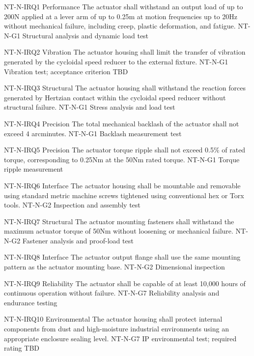 \documentclass[confidential]{../../../classes/nervtech-engdoc}
\begin{document}
\begin{requirementstable}

  \reqrow
  {NT-N-IRQ1}
  {Performance}
  {The actuator shall withstand an output load of up to 200N applied at a lever arm of up to 0.25m at motion frequencies up to 20Hz without mechanical failure, including creep, plastic deformation, and fatigue.}
  {NT-N-G1}
  {Structural analysis and dynamic load test}

  \reqrow
  {NT-N-IRQ2}
  {Vibration}
  {The actuator housing shall limit the transfer of vibration generated by the cycloidal speed reducer to the external fixture.}
  {NT-N-G1}
  {Vibration test; acceptance criterion TBD}

  \reqrow
  {NT-N-IRQ3}
  {Structural}
  {The actuator housing shall withstand the reaction forces generated by Hertzian contact within the cycloidal speed reducer without structural failure.}
  {NT-N-G1}
  {Stress analysis and load test}

  \reqrow
  {NT-N-IRQ4}
  {Precision}
  {The total mechanical backlash of the actuator shall not exceed 4 arcminutes.}
  {NT-N-G1}
  {Backlash measurement test}

  \reqrow
  {NT-N-IRQ5}
  {Precision}
  {The actuator torque ripple shall not exceed 0.5\% of rated torque, corresponding to 0.25Nm at the 50Nm rated torque.}
  {NT-N-G1}
  {Torque ripple measurement}

  \reqrow
  {NT-N-IRQ6}
  {Interface}
  {The actuator housing shall be mountable and removable using standard metric machine screws tightened using conventional hex or Torx tools.}
  {NT-N-G2}
  {Inspection and assembly test}

  \reqrow
  {NT-N-IRQ7}
  {Structural}
  {The actuator mounting fasteners shall withstand the maximum actuator torque of 50Nm without loosening or mechanical failure.}
  {NT-N-G2}
  {Fastener analysis and proof-load test}

  \reqrow
  {NT-N-IRQ8}
  {Interface}
  {The actuator output flange shall use the same mounting pattern as the actuator mounting base.}
  {NT-N-G2}
  {Dimensional inspection}

  \reqrow
  {NT-N-IRQ9}
  {Reliability}
  {The actuator shall be capable of at least 10,000 hours of continuous operation without failure.}
  {NT-N-G7}
  {Reliability analysis and endurance testing}

  \reqrow
  {NT-N-IRQ10}
  {Environmental}
  {The actuator housing shall protect internal components from dust and high-moisture industrial environments using an appropriate enclosure sealing level.}
  {NT-N-G7}
  {IP environmental test; required rating TBD}

\end{requirementstable}
\end{document}
